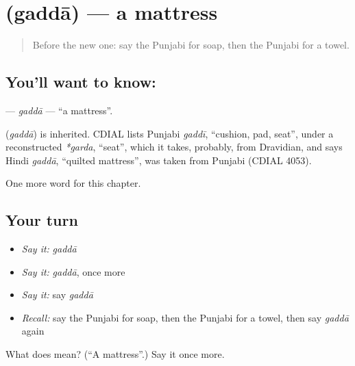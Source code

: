 \section[\texorpdfstring{\pa{ਗੱਦਾ} (gaddā)}{ਗੱਦਾ (gaddā)}]{ (gaddā) — a mattress}

\label{lesson:PA-C114-gadda}



\begin{quote}
Before the new one: say the Punjabi for soap, then the Punjabi for a towel.
\end{quote}

\subsection*{You'll want to know: }
\textbf{} — \emph{gaddā} — \textquotedblleft{}a mattress\textquotedblright{}.

\begin{cousinweb}
\textbf{} (\emph{gaddā}) is inherited. CDIAL lists Punjabi \emph{gaddī}, \textquotedblleft{}cushion, pad, seat\textquotedblright{}, under a reconstructed \emph{*garda}, \textquotedblleft{}seat\textquotedblright{}, which it takes, probably, from Dravidian, and says Hindi \emph{gaddā}, \textquotedblleft{}quilted mattress\textquotedblright{}, was taken from Punjabi (CDIAL 4053).
\end{cousinweb}

\begin{grammarlens}[title={What you've built}]
One more word for this chapter.
\end{grammarlens}

\subsection*{Your turn}
\begin{itemize}
\raggedright
  \item \emph{Say it:} \emph{gaddā}
  \item \emph{Say it:} \emph{gaddā}, once more
  \item \emph{Say it:} say \emph{gaddā}
  \item \emph{Recall:} say the Punjabi for soap, then the Punjabi for a towel, then say \emph{gaddā} again
\end{itemize}

\begin{tcolorbox}[breakable,colback=teal!4,colframe=teal!35!black,title={Before you move on}]
What does  mean? (\textquotedblleft{}A mattress\textquotedblright{}.) Say it once more.
\end{tcolorbox}
